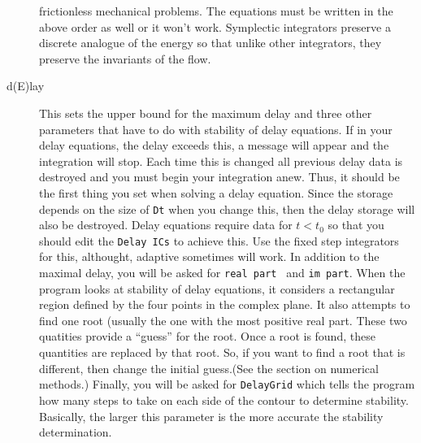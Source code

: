 \documentclass{article}
\begin{document}
\begin{description}
frictionless mechanical problems. The equations must be written in the
above order as well or it won't work.  Symplectic integrators preserve
a discrete analogue of the energy so that unlike other integrators,
they preserve the invariants of the flow. 
\item[d(E)lay]  This sets the upper bound for the maximum delay and
three other parameters that have to do with stability of delay
equations.
 If in your delay
 equations, the delay exceeds this, a message will appear and the integration 
will stop.  Each time this is changed all previous delay data is destroyed and
 you must begin your integration anew.  Thus, it should be the first thing you
 set when solving a delay equation.  Since the storage depends on the size of
 {\tt Dt} when you change this, then the delay storage will also be
destroyed.  Delay equations require data for $t<t_0$ so that you
should edit the {\tt Delay ICs} to achieve this.  Use the fixed step
integrators for this, althought, adaptive sometimes will work.
  In addition to the maximal delay,
you will be asked for {\tt real part } and {\tt im part}.  When the
program looks at stability of delay equations, it considers a
rectangular region defined by the four points in the complex plane.
It also attempts to find one root (usually the one with the most positive
real part. These two quatities provide a ``guess'' for the root. 
Once a root is found, these quantities are replaced by that root. So,
if you want to find a root that is different, then change the initial
guess.(See the section
on numerical methods.) Finally, you will be asked for {\tt DelayGrid}
which tells the program how many steps to take on each side of the
contour to determine stability.  Basically, the larger this
parameter is the more accurate the stability determination.


\end{description}
\end{document}
